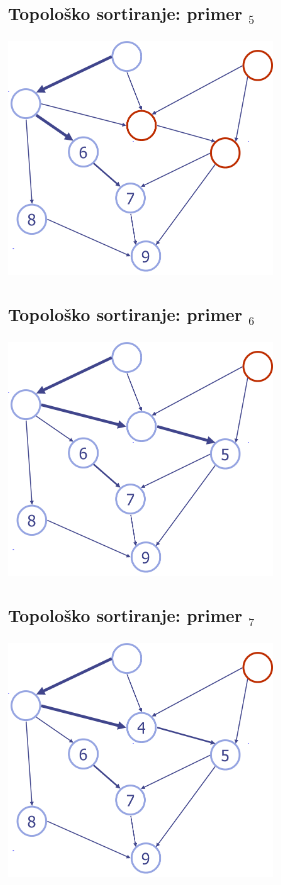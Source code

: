 \documentclass[compress]{beamer}
\begin{document}
\begin{frame}[fragile]
  \frametitle{Topološko sortiranje: primer $_5$}
  \begin{center}
    \includegraphics[width=7cm]{asp-14-pic52.png}
  \end{center}
\end{frame}

\begin{frame}[fragile]
  \frametitle{Topološko sortiranje: primer $_6$}
  \begin{center}
    \includegraphics[width=7cm]{asp-14-pic53.png}
  \end{center}
\end{frame}

\begin{frame}[fragile]
  \frametitle{Topološko sortiranje: primer $_7$}
  \begin{center}
    \includegraphics[width=7cm]{asp-14-pic54.png}
  \end{center}
\end{frame}
\end{document}
